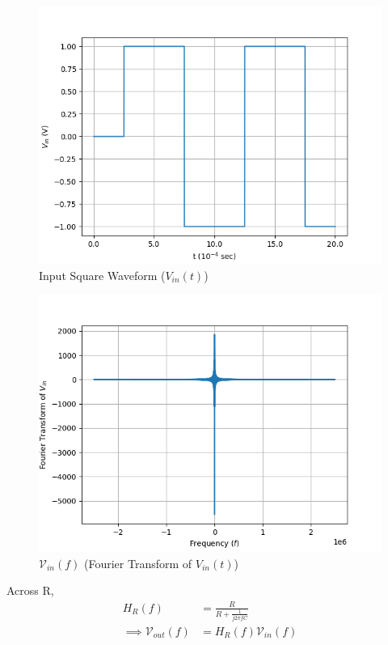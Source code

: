 \documentclass[journal,12pt,twocolumn]{IEEEtran}
\theoremstyle{remark}
\begin{document}
\begin{figure}[!h]
    \centering
    \includegraphics[width = \columnwidth]{figs/square.png}
    \caption{Input Square Waveform ($V_{in}(t)$)}
    \label{fig:square_gate.ph.23.37}
\end{figure}
\begin{figure}[!h]
    \centering
    \includegraphics[width = \columnwidth]{figs/square_fourier.png}
    \caption{$\mathcal{V}_{in}(f)$ (Fourier Transform of $V_{in}(t)$)}
    \label{fig:square_fft_gate.ph.23.37}
\end{figure}
Across R,
\begin{align}
    H_{R}(f) &= \frac{R}{R + \frac{1}{j2\pi f C}}\\
    \implies \mathcal{V}_{out}(f) &= H_{R}(f)\mathcal{V}_{in}(f)
\end{align}
\end{document}
